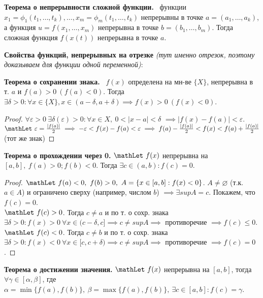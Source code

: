 \bigbreak
\textbf{Теорема о непрерывности сложной функции.} \mathLet \ функции $x_1 = \phi_1(t_1,\dots,t_k), \dots, x_m = \phi_m(t_1,\dots,t_k)$  непрерывны в точке $a=(a_1,\dots,a_k)$, а функция $u = f(x_1,\dots,x_m)$ непрерывна в точке $b=(b_1,\dots,b_m)$. Тогда сложная функция $f(x(t))$ непрерывна в точке $a$.

\bigbreak
\textbf{Свойства функций, непрерывных на отрезке} \textit{(тут именно отрезок, поэтому доказываем для функции одной переменной)}:

\bigbreak
\textbf{Теорема о сохранении знака.} \mathLet \ $f(x)$ определена на мн-ве $\{X\}$, непрерывна в т. $a$ и $f(a) > 0 ~ (f(a) < 0)$. Тогда $\exists \delta > 0: \forall x \in \{X\}, x \in (a-\delta, a+\delta) \implies f(x) > 0 ~ (f(x) < 0)$. 

\begin{proof}
$\forall \varepsilon > 0 ~ \exists \delta(\varepsilon)>0: \forall x \in {X}, ~ 0 < \left|x-a\right| < \delta$
$\implies \left|f(x)-f(a)\right|<\varepsilon$. 
$\mathLet ~ \varepsilon=\frac{\left|f(a)\right|}{2} \implies -\varepsilon < f(x) - f(a) < \varepsilon \implies f(a) - \frac{\left|f(a)\right|}{2} < f(x) < f(a) + \frac{\left|f(a)\right|}{2}$ (тот же знак)
\end{proof}

\bigbreak
\textbf{Теорема о прохождении через 0.} $\mathLet ~ f(x)$ непрерывна на $[a,b], ~ f(a) > 0; f(b) < 0$. Тогда $\exists c \in (a,b): f(c) = 0$.

\begin{proof}
$\mathLet ~ f(a) < 0, ~ f(b) > 0, ~ A = \{x \in [a,b]: f(x) < 0\}$. $A \neq \varnothing$ (т.к. $a \in A$) и ограничено сверху (например, числом $b$) $\implies \exists sup A = c$. Покажем, что $f(c) = 0$. \\
$\mathLet ~ f(c) > 0$. Тогда $c \neq a$ и по т. о сохр. знака $\exists \delta > 0: f(x) > 0 ~ \forall x \in (c - \delta, c] \implies c \neq sup A \implies$ противоречие $\implies f(c) \leq 0$. \\
$\mathLet ~ f(c) < 0$. Тогда $c \neq b$ и по т. о сохр. знака $\exists \delta > 0: f(x) < 0 ~ \forall x \in [c, c + \delta) \implies c \neq sup A \implies$ противоречие $\implies f(c) = 0$.
\end{proof}

\bigbreak
\textbf{Теорема о достижении значения.} $\mathLet ~ f(x)$ непрерывна на $[a,b]$, тогда $\forall \gamma \in [\alpha, \beta]$, где $\alpha=\min\{f(a), f(b)\}, ~ \beta=\max\{f(a), f(b)\}, ~ \exists c \in [a,b]: f(c) = \gamma$.

